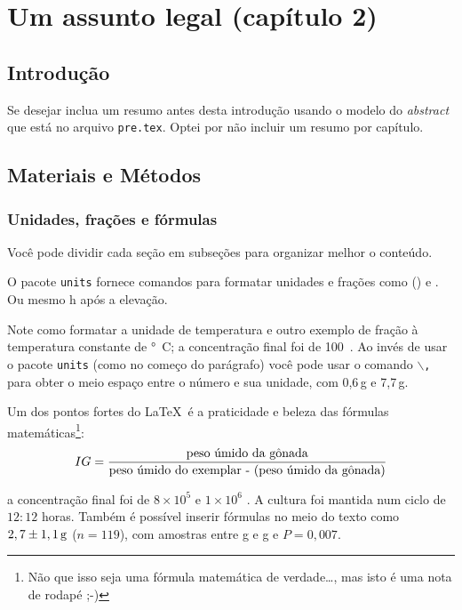 \pagestyle{empty}
\cleardoublepage
\pagestyle{fancy}

\chapter{Um assunto legal (capítulo 2)}\label{cap2}

\section{Introdução}\label{cap2:intro}

Se desejar inclua um resumo antes desta introdução usando o modelo do \emph{abstract} que está no arquivo \texttt{pre.tex}.
Optei por não incluir um resumo por capítulo.

\section{Materiais e Métodos}\label{cap2:mem}

\subsection{Unidades, frações e fórmulas}\label{cap2:mem:unit}

Você pode dividir cada seção em subseções para organizar melhor o conteúdo.

O pacote \texttt{units} fornece comandos para formatar unidades e frações como  () e .
Ou mesmo \unit[7,5]{h} após a elevação.

Note como formatar a unidade de temperatura e outro exemplo de fração à temperatura constante de \unit[24]{°C}; a concentração final foi de 100~.
Ao invés de usar o pacote \texttt{units} (como no começo do parágrafo) você pode usar o comando \texttt{$\backslash$,} para obter o meio espaço entre o número e sua unidade, com 0,6\,g e 7,7\,g.

Um dos pontos fortes do \LaTeX\ é a praticidade e beleza das fórmulas matemáticas\footnote{Não que isso seja uma fórmula matemática de verdade\ldots, mas isto é uma nota de rodapé ;-)}:
\begin{equation}\label{eq:ind}\notag
IG=\frac{\text{peso úmido da gônada}}{\text{peso úmido do exemplar - (peso úmido da gônada)}}
\end{equation}

a concentração final foi de $8\times10^5$ e $1\times10^6$ .
A cultura foi mantida num ciclo de $12:12$ horas.
Também é possível inserir fórmulas no meio do texto como $2,7\pm\unit[1,1]{g}$ ($n=119$), com amostras entre \unit[0,6]{g} e \unit[7,7]{g} e $P=0,007$.

